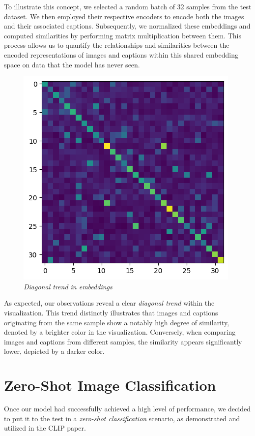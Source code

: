 \documentclass[10pt,twocolumn,letterpaper]{article}
\begin{document}
To illustrate this concept, we selected a random batch of 32 samples from the test dataset.
We then employed their respective encoders to encode both the images and their associated captions.
Subsequently, we normalized these embeddings and computed similarities by performing matrix multiplication between them. This process allows us to quantify the relationships and similarities between the encoded representations of images and captions within this shared embedding space on data that the model has never seen.

\begin{figure}[H]
   \centering
   \includegraphics[width=0.6\linewidth]{img/Diagonal.png}
   \caption{\textit{Diagonal trend in embeddings}}
\end{figure}

As expected, our observations reveal a clear \textit{diagonal trend} within the visualization.
This trend distinctly illustrates that images and captions originating from the same sample show a notably high degree of similarity, denoted by a brighter color in the visualization.
Conversely, when comparing images and captions from different samples, the similarity appears significantly lower, depicted by a darker color.


\section{Zero-Shot Image Classification}

Once our model had successfully achieved a high level of performance, we decided to put it to the test in a \textit{zero-shot classification} scenario, as demonstrated and utilized in the CLIP paper.
\end{document}
